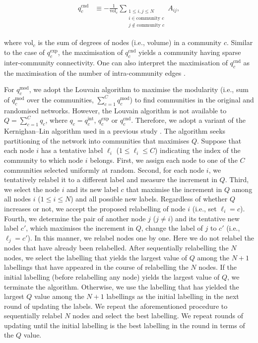 \documentclass[fleqn,10pt]{wlscirep}
\def\qmod{q^{\text{mod}}}
\def\qint{q^{\text{int}}}
\def\qexp{q^{\text{exp}}}
\def\qcnd{q^{\text{cnd}}}
\def\vol{\text{vol}}
\begin{document}
\begin{linenomath}
\begin{align}
    \qcnd _c &\equiv - \frac{1}{\vol_c}  \sum \limits _{{\substack{1 \leq i,j \leq N\\ i \in \text{community $c$}\\ j \notin \text{community $c$}}}} A_{ij}, \label{eq:qcnd}
\end{align}
\end{linenomath}
where $\vol_c$ is the sum of degrees of nodes (i.e., volume) in a community $c$.
Similar to the case of $\qexp_c$, the maximisation of $\qcnd _c$ yields a community having sparse inter-community connectivity. 
One can also interpret the maximisation of $\qcnd_c$ as the maximisation of the number of intra-community edges \cite{Luxburg2007}. 

For $\qmod_c$, we adopt the Louvain algorithm to maximise the modularity (i.e., sum of $\qmod_c$ over the communities, $\sum_{c=1}^C \qmod_c$) to find communities in the original and randomised networks. 
However, the Louvain algorithm is not available to $Q=\sum_{c=1}^C q_c$, where $q_c = \qint_c$, $\qexp_c$ or $\qcnd_c$.
Therefore, we adopt a variant of the Kernighan--Lin algorithm \cite{Kernighan1970} used in a previous study \cite{Karrer2011}.
The algorithm seeks partitioning of the network into communities that maximises $Q$.
Suppose that each node $i$ has a tentative label $\ell_i$ ($1 \leq \ell_i \leq C$) indicating the index of the community to which node $i$ belongs. 
First, we assign each node to one of the $C$ communities selected uniformly at random.
Second, for each node $i$, we tentatively relabel it to a different label and measure the increment in $Q$. 
Third, we select the node $i$ and its new label $c$ that maximise the increment in $Q$ among all nodes $i$ ($1\le i\le N$) and all possible new labels. 
Regardless of whether $Q$ increases or not, we accept the proposed relabelling of node $i$ (i.e., set $\ell_i = c$). 
Fourth, we determine the pair of another node $j$ ($j\neq i$) and its tentative new label $c'$, which maximises the increment in $Q$, change the label of $j$ to $c'$ (i.e., $\ell_j = c'$). 
In this manner, we relabel nodes one by one. Here we do not relabel the nodes that have already been relabelled.
After sequentially relabelling the $N$ nodes, we select the labelling that yields the largest value of $Q$ among the $N+1$ labellings that have appeared in the course of relabelling the $N$ nodes. 
If the initial labelling (before relabelling any node) yields the largest value of $Q$, we terminate the algorithm. 
Otherwise, we use the labelling that has yielded the largest $Q$ value among the $N+1$ labellings as the initial labelling in the next round of updating the labels.
We repeat the aforementioned procedure to sequentially relabel $N$ nodes and select the best labelling.
We repeat rounds of updating until the initial labelling is the best labelling in the round in terms of the $Q$ value.
\end{document}
